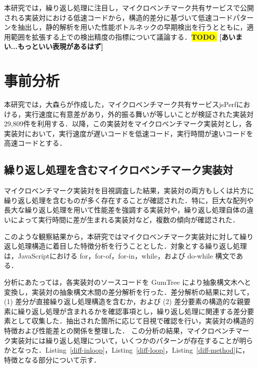 \documentclass[submit,techrep,noauthor]{ipsj}
\newcommand{\todo}[1]{\colorbox{yellow}{{\bf TODO}:}{\color{red} {\textbf{[#1]}}}}
\begin{document}
本研究では，繰り返し処理に注目し，マイクロベンチマーク共有サービスで公開される実装対における低速コードから，構造的差分に基づいて低速コードパターンを抽出し，静的解析を用いた性能ボトルネックの早期検出を行うとともに，適用範囲を拡張する上での検出精度の指標について議論する．\todo{あいまい...もっといい表現があるはず}


\section{事前分析}
\label{sec:pre-analysis}


本研究では，大森ら\cite{omori}が作成した，マイクロベンチマーク共有サービスjsPerfにおける，実行速度に有意差があり，外的振る舞いが等しいことが検証された実装対29,809件を利用する．以降，この実装対をマイクロベンチマーク実装対とし，各実装対において，実行速度が遅いコードを低速コード，実行時間が速いコードを高速コードとする．

\subsection{繰り返し処理を含むマイクロベンチマーク実装対}
\label{section3.1}


マイクロベンチマーク実装対を目視調査した結果，実装対の両方もしくは片方に繰り返し処理を含むものが多く存在することが確認された．特に，巨大な配列や長大な繰り返し処理を用いて性能差を強調する実装対や，繰り返し処理自体の違いによって実行時間に差が生まれる実装対など，複数の傾向が確認された．

このような観察結果から，本研究ではマイクロベンチマーク実装対に対して繰り返し処理構造に着目した特徴分析を行うこととした．対象とする繰り返し処理は，JavaScriptにおける for，for-of，for-in，while，および do-while 構文である．

分析にあたっては，各実装対のソースコードを GumTree \cite{gumtree}により抽象構文木へと変換し，実装対の抽象構文木間の差分解析を行った．差分解析の結果に対して，(1) 差分が直接繰り返し処理構造を含むか，および (2) 差分要素の構造的な親要素に繰り返し処理が含まれるかを確認事項とし，繰り返し処理に関連する差分要素として収集した．抽出された箇所に応じて目視で確認を行い，実装対の構造的特徴および性能差との関係を整理した．
この分析の結果，マイクロベンチマーク実装対には繰り返し処理について，いくつかのパターンが存在することが明らかとなった．Listing~\ref{diff-inloop}，Listing~\ref{diff-loop}，Listing~\ref{diff-method}に，特徴となる部分について示す．
\end{document}
